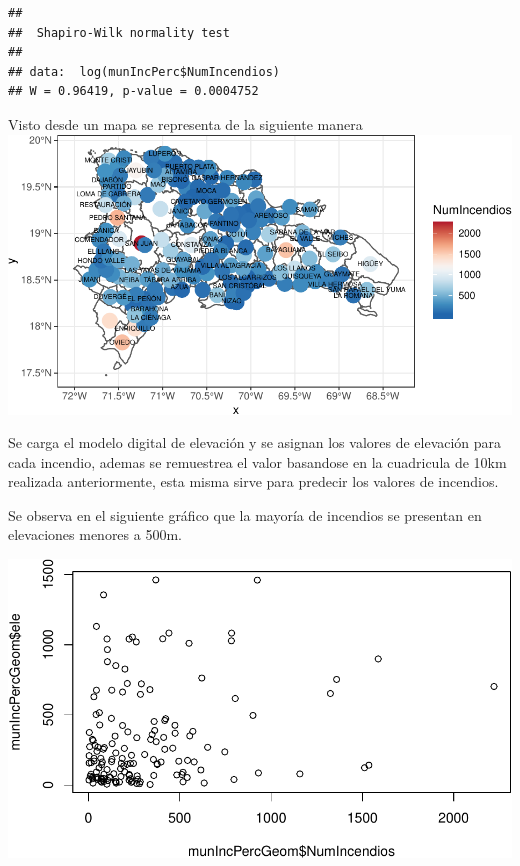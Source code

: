 \documentclass[11pt,]{article}
\newenvironment{Shaded}{\begin{snugshade}}{\end{snugshade}}
\newcommand{\KeywordTok}[1]{\textcolor[rgb]{0.13,0.29,0.53}{\textbf{#1}}}
\newcommand{\OperatorTok}[1]{\textcolor[rgb]{0.81,0.36,0.00}{\textbf{#1}}}
\newcommand{\NormalTok}[1]{#1}
\begin{document}
\begin{Shaded}
\end{Shaded}

\begin{verbatim}
## 
##  Shapiro-Wilk normality test
## 
## data:  log(munIncPerc$NumIncendios)
## W = 0.96419, p-value = 0.0004752
\end{verbatim}

Visto desde un mapa se representa de la siguiente manera
\includegraphics{proyecto_files/figure-latex/unnamed-chunk-50-1.pdf}

Se carga el modelo digital de elevación y se asignan los valores de
elevación para cada incendio, ademas se remuestrea el valor basandose en
la cuadricula de 10km realizada anteriormente, esta misma sirve para
predecir los valores de incendios.

Se observa en el siguiente gráfico que la mayoría de incendios se
presentan en elevaciones menores a 500m.

\includegraphics{proyecto_files/figure-latex/unnamed-chunk-52-1.pdf}
\end{document}
